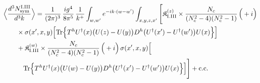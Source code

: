 \begingroup\small
\begin{align}\label{eq:S-I.III-3}
&\Big\langle\frac{d^{3}N^{\rm I.III}_{{\rm sym}}}{d^{3}k}\Big\rangle=\frac{1}{(2\pi)^{3}}\, \frac{ig^{4}}{8\pi^{5}}\, \frac{1}{k^{+}} \int_{w,w'}e^{-ik\cdot(w-w')} \int_{x,y,z,x'}\Bigg[ \mathfrak{K}^{(z)}_{\rm I.III} \times \frac{N_{c}}{(N_{c}^{2}-4)(N_{c}^{2}-1)}\, \Big(+i\Big)\notag\\
&\quad\quad \times \sigma(x',x,y)\Big[ {\rm Tr}\Big\{T^{h}U^{\dagger}(x)\big(U(z)-U(y)\big)D^{h}\big(U^{\dagger}(x')-U^{\dagger}(w')\big)U(x)\Big\}\Big]\notag\\
&\quad\quad + \mathfrak{K}^{(w)}_{\rm I.III} \times \frac{N_{c}}{(N_{c}^{2}-4)(N_{c}^{2}-1)}\, \Big(+i\Big)\, \sigma(x',x,y)\Big[\notag\\
&\quad\quad\quad {\rm Tr}\Big\{T^{h}U^{\dagger}(x)\big(U(w)-U(y)\big)D^{h}\big(U^{\dagger}(x')-U^{\dagger}(w')\big)U(x)\Big\}\Big]\Bigg] +{\rm c.c.}
\end{align}
\endgroup
